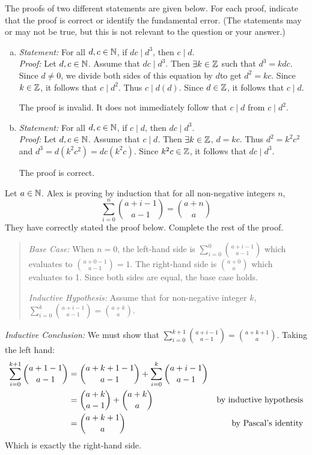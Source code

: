 \question The proofs of two different statements are given below.
For each proof, indicate that the proof is correct or identify the fundamental error.
(The statements may or may not be true, but this is not relevant to the question or your answer.)
\begin{enumerate}[(a)]
  \item \emph{Statement:} For all $d,c\in\mathbb{N}$, if $dc \mid d^3$, then $c \mid d$. \\
        \emph{Proof:} Let $d,c\in\mathbb{N}$. Assume that $dc \mid d^3$.
        Then $\exists k\in\mathbb{Z}$ such that $d^3 = kdc$.
        Since $d \neq 0$, we divide both sides of this equation by $d $to get $d^2 = kc$.
        Since $k \in \mathbb{Z}$, it follows that $c \mid d^2$. Thus $c \mid d(d)$.
        Since $d \in \mathbb{Z}$, it follows that $c \mid d$.

        The proof is invalid. It does not immediately follow that $c \mid d$ from $c \mid d^2$.
  \item \emph{Statement:} For all $d,c\in\mathbb{N}$, if $c \mid d$, then $dc \mid d^3$. \\
        \emph{Proof:} Let $d,c\in\mathbb{N}$. Assume that $c \mid d$.
        Then $\exists k \in \mathbb{Z}$, $d=kc$.
        Thus $d^2=k^2c^2$ and $d^3=d(k^2c^2)=dc(k^2c)$.
        Since $k^2c\in\mathbb{Z}$, it follows that $dc \mid d^3$.

        The proof is correct.
\end{enumerate}


\question Let $a \in \mathbb{N}$. Alex is proving by induction that for all non-negative integers $n$,
\begin{equation*}
  \sum_{i=0}^n\binom{a+i-1}{a-1} = \binom{a+n}{a}
\end{equation*}
They have correctly stated the proof below. Complete the rest of the proof.

\begin{quote}
  \emph{Base Case:} When $n=0$, the left-hand side is $\sum^0_{i=0}\binom{a+i-1}{a-1}$
  which evaluates to $\binom{a+0-1}{a-1}=1$.
  The right-hand side is $\binom{a+0}{a}$ which evaluates to 1.
  Since both sides are equal, the base case holds.

  \emph{Inductive Hypothesis:} Assume that for non-negative integer $k$,
  $\sum_{i=0}^k\binom{a+i-1}{a-1}=\binom{a+k}{a}$.
\end{quote}

\emph{Inductive Conclusion:}
We must show that $\sum_{i=0}^{k+1}\binom{a+i-1}{a-1} = \binom{a+k+1}{a}$.
Taking the left hand:
\begin{align*}
  \sum_{i=0}^{k+1}\binom{a+1-1}{a-1} & = \binom{a+k+1-1}{a-1} + \sum_{i=0}^{k}\binom{a+i-1}{a-1} \\
                                     & = \binom{a+k}{a-1} + \binom{a+k}{a} & \text{by inductive hypothesis}                   \\
                                     & = \binom{a+k+1}{a} & \text{by Pascal's identity}
\end{align*}
Which is exactly the right-hand side.

